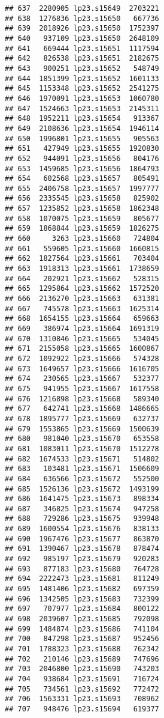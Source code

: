 \documentclass[
]{article}
\begin{document}
\begin{verbatim}
## 637  2280905 lp23.s15649  2703221
## 638  1276836 lp23.s15650   667736
## 639  2018926 lp23.s15650  1752397
## 640   937109 lp23.s15650  2648109
## 641   669444 lp23.s15651  1117594
## 642   826538 lp23.s15651  2182675
## 643   900251 lp23.s15652   548749
## 644  1851399 lp23.s15652  1601133
## 645  1153348 lp23.s15652  2541275
## 646  1970091 lp23.s15653  1060780
## 647  1524663 lp23.s15653  2145311
## 648  1952211 lp23.s15654   913367
## 649  2108636 lp23.s15654  1946114
## 650  1996801 lp23.s15655   905563
## 651   427949 lp23.s15655  1920830
## 652   944091 lp23.s15656   804176
## 653  1459685 lp23.s15656  1864793
## 654   602568 lp23.s15657   805491
## 655  2406758 lp23.s15657  1997777
## 656  2335545 lp23.s15658   825902
## 657  1235852 lp23.s15658  1862348
## 658  1070075 lp23.s15659   805677
## 659  1868844 lp23.s15659  1826275
## 660     3263 lp23.s15660   724804
## 661   559605 lp23.s15660  1660815
## 662  1827564 lp23.s15661   703404
## 663  1918313 lp23.s15661  1738659
## 664   202921 lp23.s15662   528315
## 665  1295864 lp23.s15662  1572520
## 666  2136270 lp23.s15663   631381
## 667   745578 lp23.s15663  1625314
## 668  1654155 lp23.s15664   659663
## 669   386974 lp23.s15664  1691319
## 670  1310846 lp23.s15665   534045
## 671  2155058 lp23.s15665  1600867
## 672  1092922 lp23.s15666   574328
## 673  1649657 lp23.s15666  1616705
## 674   230565 lp23.s15667   532377
## 675   941955 lp23.s15667  1617558
## 676  1216898 lp23.s15668   589340
## 677   642741 lp23.s15668  1486665
## 678  1895777 lp23.s15669   632737
## 679  1553865 lp23.s15669  1500639
## 680   981040 lp23.s15670   653558
## 681  1083011 lp23.s15670  1512278
## 682  1674533 lp23.s15671   514802
## 683   103481 lp23.s15671  1506609
## 684   636566 lp23.s15672   552500
## 685  1526136 lp23.s15672  1493199
## 686  1641475 lp23.s15673   898334
## 687   346825 lp23.s15674   947258
## 688   729286 lp23.s15675   939948
## 689  1600554 lp23.s15676   838133
## 690  1967476 lp23.s15677   863870
## 691  1390467 lp23.s15678   878474
## 692   985197 lp23.s15679   920283
## 693   877183 lp23.s15680   764728
## 694  2222473 lp23.s15681   811249
## 695  1481406 lp23.s15682   697359
## 696  1342505 lp23.s15683   732399
## 697   707977 lp23.s15684   800122
## 698  2039607 lp23.s15685   792098
## 699  1484874 lp23.s15686   741104
## 700   847298 lp23.s15687   952456
## 701  1788323 lp23.s15688   762342
## 702   210146 lp23.s15689   747696
## 703  2046800 lp23.s15690   743203
## 704   938684 lp23.s15691   716724
## 705   734561 lp23.s15692   772472
## 706  1563331 lp23.s15693   708962
## 707   948476 lp23.s15694   619377

\end{verbatim}
\end{document}
